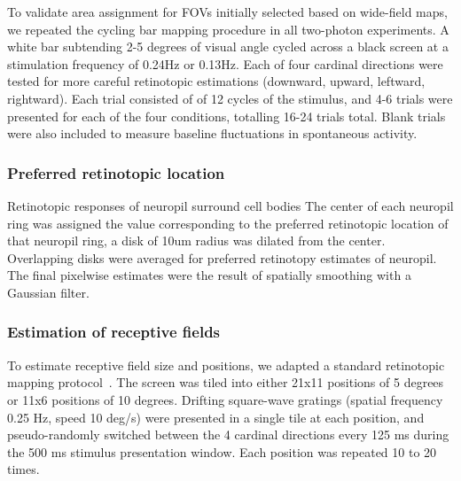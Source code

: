 To validate area assignment for FOVs initially selected based on wide-field maps, we repeated the cycling bar mapping procedure in all two-photon experiments. A white bar subtending 2-5 degrees of visual angle cycled across a black screen at a stimulation frequency of 0.24Hz or 0.13Hz. Each of four cardinal directions were tested for more careful retinotopic estimations (downward, upward, leftward, rightward). Each trial consisted of of 12 cycles of the stimulus, and 4-6 trials were presented for each of the four conditions, totalling 16-24 trials total. Blank trials were also included to measure baseline fluctuations in spontaneous activity.  



\subsubsection{Preferred retinotopic location}
Retinotopic responses of neuropil surround cell bodies
The center of each neuropil ring was assigned the value corresponding to the preferred retinotopic location of that neuropil ring, a disk of 10um radius was dilated from the center. Overlapping disks were averaged for preferred retinotopy estimates of neuropil. The final pixelwise estimates were the result of spatially smoothing with a Gaussian filter. 


\subsubsection{Estimation of receptive fields}
To estimate receptive field size and positions, we adapted a standard retinotopic mapping protocol~\cite{Marques2018}. The screen was tiled into either 21x11 positions of 5 degrees or 11x6 positions of 10 degrees. Drifting square-wave gratings (spatial frequency 0.25 Hz, speed 10 deg/s) were presented in a single tile at each position, and pseudo-randomly switched between the 4 cardinal directions every 125 ms during the 500 ms stimulus presentation window. Each position was repeated 10 to 20 times. 

